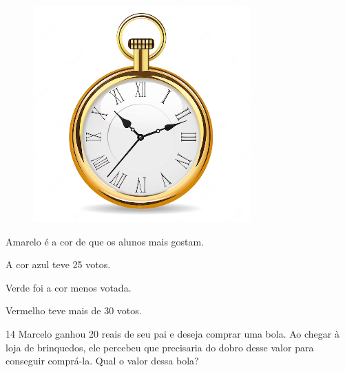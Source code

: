 \begin{figure}[htpb!]
\includegraphics[width=\textwidth]{./media/image136.png}
\end{figure}

\begin{escolha}
\item Amarelo é a cor de que os alunos mais gostam.

\item A cor azul teve 25 votos.

\item Verde foi a cor menos votada.

\item Vermelho teve mais de 30 votos.
\end{escolha}


\num{14} Marcelo ganhou 20 reais de seu pai e deseja comprar uma bola. Ao chegar
à loja de brinquedos, ele percebeu que precisaria do dobro desse valor
para conseguir comprá-la. Qual o valor dessa bola?

